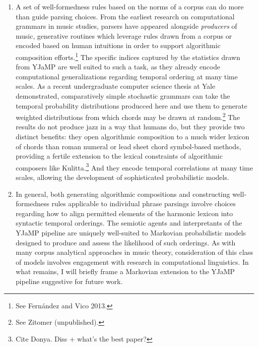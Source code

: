 \begin{enumerate}
	\item A set of well-formedness rules based on the norms of a corpus can do more than guide parsing choices.  From the earliest research on computational grammars in music studies, parsers have appeared alongside \emph{producers} of music, generative routines which leverage rules drawn from a corpus or encoded based on human intuitions in order to support algorithmic composition efforts.\footnote{See Fern\'{a}ndez and Vico 2013.}  The specific indices captured by the statistics drawn from YJaMP are well suited to such a task, as they already encode computational generalizations regarding temporal ordering at many time scales.  As a recent undergraduate computer science thesis at Yale demonstrated, comparatively simple stochastic grammars can take the temporal probability distributions producced here and use them to generate weighted distributions from which chords may be drawn at random.\footnote{See Zitomer (unpublished).}  The results do not produce jazz in a way that humans do, but they provide two distinct benefits: they open algorithmic composition to a much wider lexicon of chords than roman numeral or lead sheet chord symbol-based methods, providing a fertile extension to the lexical constraints of algorithmic composers like Kulitta.\footnote{Cite Donya.  Diss + what's the best paper?} And they encode temporal correlations at many time scales, allowing the development of sophisticated probabilistic models.

	\item In general, both generating algorithmic compositions and constructing well-formedness rules applicable to individual phrase parsings involve choices regarding how to align permitted elements of the harmonic lexicon into syntactic temporal orderings.  The semiotic agents and interpretants of the YJaMP pipeline are uniquely well-suited to Markovian probabilistic models designed to produce and assess the likelihood of such orderings.  As with many corpus analytical approaches in music theory, consideration of this class of models involves engagement with research in computational linguistics.  In what remains, I will briefly frame a Markovian extension to the YJaMP pipeline suggestive for future work.
	

\end{enumerate}

